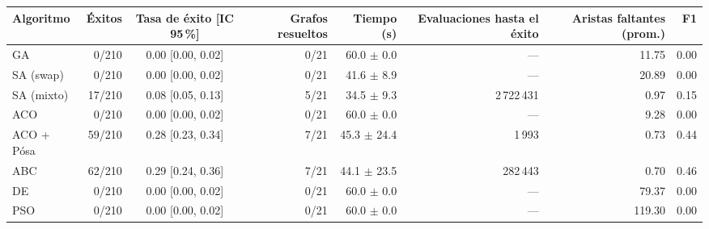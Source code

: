 \begin{tabular}{lrcrrrrr}
\toprule
Algoritmo & Éxitos & Tasa de éxito [IC 95\,\%] & Grafos resueltos & Tiempo (s) & Evaluaciones hasta el éxito & Aristas faltantes (prom.) & F1 \\
\midrule
GA & 0/210 & 0.00 [0.00, 0.02] & 0/21 & 60.0 $\pm$ 0.0 & --- & 11.75 & 0.00 \\
SA (swap) & 0/210 & 0.00 [0.00, 0.02] & 0/21 & 41.6 $\pm$ 8.9 & --- & 20.89 & 0.00 \\
SA (mixto) & 17/210 & 0.08 [0.05, 0.13] & 5/21 & 34.5 $\pm$ 9.3 & 2\,722\,431 & 0.97 & 0.15 \\
ACO & 0/210 & 0.00 [0.00, 0.02] & 0/21 & 60.0 $\pm$ 0.0 & --- & 9.28 & 0.00 \\
ACO + Pósa & 59/210 & 0.28 [0.23, 0.34] & 7/21 & 45.3 $\pm$ 24.4 & 1\,993 & 0.73 & 0.44 \\
ABC & 62/210 & 0.29 [0.24, 0.36] & 7/21 & 44.1 $\pm$ 23.5 & 282\,443 & 0.70 & 0.46 \\
DE & 0/210 & 0.00 [0.00, 0.02] & 0/21 & 60.0 $\pm$ 0.0 & --- & 79.37 & 0.00 \\
PSO & 0/210 & 0.00 [0.00, 0.02] & 0/21 & 60.0 $\pm$ 0.0 & --- & 119.30 & 0.00 \\
\bottomrule
\end{tabular}
